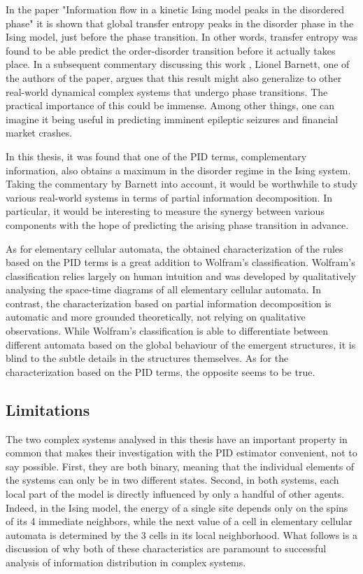 \documentclass[12pt]{article}
\begin{document}
In the paper "Information flow in a kinetic Ising model peaks in the disordered phase" \cite{barnett-ising} it is shown that global transfer entropy peaks in the disorder phase in the Ising model, just before the phase transition. In other words, transfer entropy was found to be able predict the order-disorder transition before it actually takes place. In a subsequent commentary discussing this work \cite{inf-flow-ising-commentary}, Lionel Barnett, one of the authors of the paper, argues that this result might also generalize to other real-world dynamical complex systems that undergo phase transitions. The practical importance of this could be immense. Among other things, one can imagine it being useful in predicting imminent epileptic seizures and financial market crashes. 

In this thesis, it was found that one of the PID terms, complementary information, also obtains a maximum in the disorder regime in the Ising system. Taking the commentary by Barnett into account, it would be worthwhile to study various real-world systems in terms of partial information decomposition. In particular, it would be interesting to measure the synergy between various components with the hope of predicting the arising phase transition  in advance.

As for elementary cellular automata, the obtained characterization of the rules based on the PID terms is a great addition to Wolfram's classification. Wolfram's classification relies largely on human intuition and was developed by qualitatively analysing the space-time diagrams of all elementary cellular automata. In contrast, the characterization based on partial information decomposition is automatic and more grounded theoretically, not relying on qualitative observations. While Wolfram's classification is able to differentiate between different automata based on the global behaviour of the emergent structures, it is blind to the subtle details in the structures themselves. As for the characterization based on the PID terms, the opposite seems to be true. 

\subsection{Limitations}

The two complex systems analysed in this thesis have an important property in common that makes their investigation with the PID estimator convenient, not to say possible. First, they are both binary, meaning that the individual elements of the systems can only be in two different states. Second, in both systems, each local part of the model is directly influenced by only a handful of other agents. Indeed, in the Ising model, the energy of a single site depends only on the spins of its 4 immediate neighbors, while the next value of a cell in elementary cellular automata is determined by the 3 cells in its local neighborhood. What follows is a discussion of why both of these characteristics are paramount to successful analysis of information distribution in complex systems. 
\end{document}
